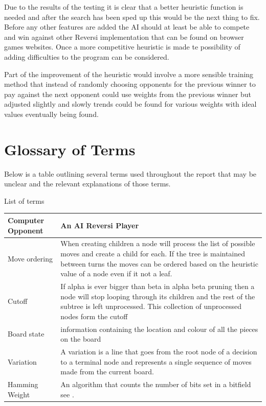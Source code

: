 \documentclass[final]{cmpreport}
\begin{document}
Due to the results of the testing it is clear that a better heuristic function is needed and after the search has been sped up this would be the next thing to fix. Before any other features are added the AI should at least be able to compete and win against other Reversi implementation that can be found on browser games websites. Once a more competitive heuristic is made te possibility of adding difficulties to the program can be considered.

Part of the improvement of the heuristic would involve a more sensible training method that instead of randomly choosing opponents for the previous winner to pay against the next opponent could use weights from the previous winner but adjusted slightly and slowly trends could be found for various weights with ideal values eventually being found.
\section{Glossary of Terms}
Below is a table outlining several terms used throughout the report that may be unclear and the relevant explanations of those terms.
\begin{cmptable}[h]{List of terms \label{glossary}}
	\begin{tabular}{|l|p{10cm}|}
		\hline
		Computer Opponent & An AI Reversi Player \\ \hline
		Move ordering & When creating children a node will process the list of possible moves and create a child for each. If the tree is maintained between turns the moves can be ordered based on the heuristic value of a node even if it not a leaf. \\ \hline
		Cutoff & If alpha is ever bigger than beta in alpha beta pruning then a node will stop looping through its children and the rest of the subtree is left unprocessed. This collection of unprocessed nodes form the cutoff \\ \hline
		Board state & information containing the location and colour of all the pieces on the board \\ \hline
		Variation & A variation is a line that goes from the root node of a decision to a terminal node and represents a single sequence of moves made from the current board.\\ \hline 
		Hamming Weight & An algorithm that counts the number of bits set in a bitfield see \cite{wiki:hamming}.
		\\ \hline
	\end{tabular}
\end{cmptable}
\clearpage
	
\end{document}

